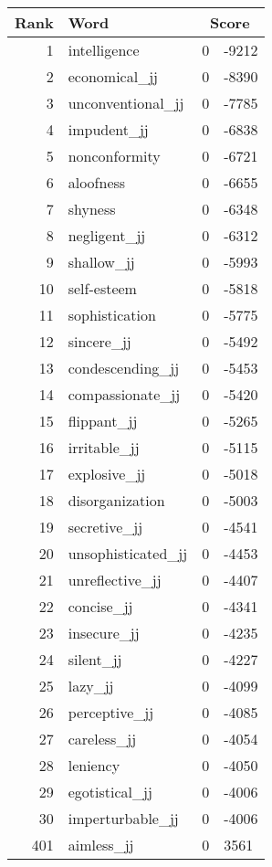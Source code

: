 \begin{longtable}[!htbp]{| rlr@{.}l |}
    \hline
    \textbf{Rank} & \textbf{Word} & \multicolumn{2}{c|}{\textbf{Score}} \\
    \hline
    \endhead
    1 & intelligence & 0 & -9212 \\
    2 & economical\_jj & 0 & -8390 \\
    3 & unconventional\_jj & 0 & -7785 \\
    4 & impudent\_jj & 0 & -6838 \\
    5 & nonconformity & 0 & -6721 \\
    6 & aloofness & 0 & -6655 \\
    7 & shyness & 0 & -6348 \\
    8 & negligent\_jj & 0 & -6312 \\
    9 & shallow\_jj & 0 & -5993 \\
    10 & self-esteem & 0 & -5818 \\
    11 & sophistication & 0 & -5775 \\
    12 & sincere\_jj & 0 & -5492 \\
    13 & condescending\_jj & 0 & -5453 \\
    14 & compassionate\_jj & 0 & -5420 \\
    15 & flippant\_jj & 0 & -5265 \\
    16 & irritable\_jj & 0 & -5115 \\
    17 & explosive\_jj & 0 & -5018 \\
    18 & disorganization & 0 & -5003 \\
    19 & secretive\_jj & 0 & -4541 \\
    20 & unsophisticated\_jj & 0 & -4453 \\
    21 & unreflective\_jj & 0 & -4407 \\
    22 & concise\_jj & 0 & -4341 \\
    23 & insecure\_jj & 0 & -4235 \\
    24 & silent\_jj & 0 & -4227 \\
    25 & lazy\_jj & 0 & -4099 \\
    26 & perceptive\_jj & 0 & -4085 \\
    27 & careless\_jj & 0 & -4054 \\
    28 & leniency & 0 & -4050 \\
    29 & egotistical\_jj & 0 & -4006 \\
    30 & imperturbable\_jj & 0 & -4006 \\
    401 & aimless\_jj & 0 & 3561 \\

\end{longtable}
